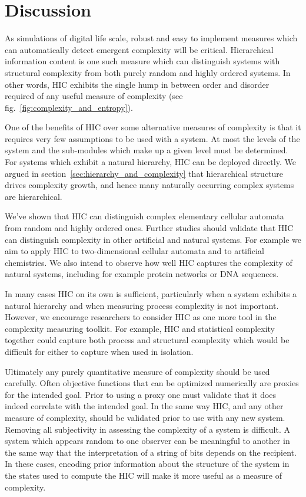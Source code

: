 \section{Discussion}

As simulations of digital life scale, robust and easy to implement measures
which can automatically detect emergent complexity will be critical.
Hierarchical information content is one such measure which can distinguish
systems with structural complexity from both purely random and highly ordered
systems. In other words, HIC exhibits the single hump in between order and
disorder required of any useful measure of complexity (see
fig.~\ref{fig:complexity_and_entropy}).

One of the benefits of HIC over some alternative measures of complexity is that
it requires very few assumptions to be used with a system. At most the levels
of the system and the sub-modules which make up a given level must be
determined. For systems which exhibit a natural hierarchy, HIC can be deployed
directly. We argued in section~\ref{sec:hierarchy_and_complexity} that
hierarchical structure drives complexity growth, and hence many naturally
occurring complex systems are hierarchical.

We've shown that HIC can distinguish complex elementary cellular automata from
random and highly ordered ones. Further studies should validate that HIC can
distinguish complexity in other artificial and natural systems. For example we
aim to apply HIC to two-dimensional cellular automata and to artificial
chemistries. We also intend to observe how well HIC captures the complexity of
natural systems, including for example protein networks or DNA sequences.

In many cases HIC on its own is sufficient, particularly when a system exhibits
a natural hierarchy and when measuring process complexity is not important.
However, we encourage researchers to consider HIC as one more tool in the
complexity measuring toolkit. For example, HIC and statistical complexity
together could capture both process and structural complexity which would be
difficult for either to capture when used in isolation.

Ultimately any purely quantitative measure of complexity should be used
carefully. Often objective functions that can be optimized numerically are
proxies for the intended goal. Prior to using a proxy one must validate that it
does indeed correlate with the intended goal. In the same way HIC, and any
other measure of complexity, should be validated prior to use with any new
system. Removing all subjectivity in assessing the complexity of a system is
difficult. A system which appears random to one observer can be meaningful
to another in the same way that the interpretation of a string of bits
depends on the recipient. In these cases, encoding prior information about the
structure of the system in the states used to compute the HIC will make it more
useful as a measure of complexity.

